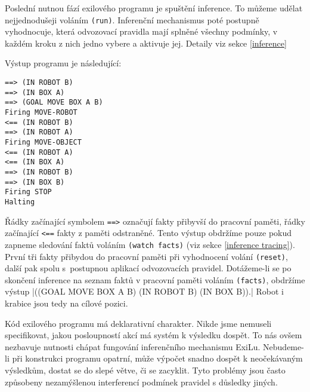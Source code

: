 Poslední nutnou fází exilového programu je spuštění inference. To můžeme udělat
nejjednodušeji voláním \verb|(run)|. Inferenční mechanismus poté postupně
vyhodnocuje, která odvozovací pravidla mají splněné všechny podmínky, v každém
kroku z nich jedno vybere a aktivuje jej. Detaily viz sekce \ref{inference}

Výstup programu je následující:
\begin{verbatim}
==> (IN ROBOT B)
==> (IN BOX A)
==> (GOAL MOVE BOX A B)
Firing MOVE-ROBOT
<== (IN ROBOT B)
==> (IN ROBOT A)
Firing MOVE-OBJECT
<== (IN ROBOT A)
<== (IN BOX A)
==> (IN ROBOT B)
==> (IN BOX B)
Firing STOP
Halting
\end{verbatim}
Řádky začínající symbolem \verb|==>| označují fakty přibyvší do pracovní paměti,
řádky začínající \verb|<==| fakty z paměti odstraněné. Tento výstup obdržíme
pouze pokud zapneme sledování faktů voláním \verb|(watch facts)| (viz sekce
\ref{inference tracing}). První tři fakty přibydou do pracovní paměti při
vyhodnocení volání \verb|(reset)|, další pak spolu s~postupnou aplikací
odvozovacích pravidel. Dotážeme-li se po skončení inference na seznam faktů v
pracovní paměti voláním \verb|(facts)|, obdržíme výstup
\cl|((GOAL MOVE BOX A B) (IN ROBOT B) (IN BOX B)).|
Robot i krabice jsou tedy na cílové pozici.

Kód exilového programu má deklarativní charakter. Nikde jsme nemuseli
specifikovat, jakou posloupností akcí má systém k výsledku dospět. To nás ovšem
nezbavuje nutnosti chápat fungování inferenčního mechanismu ExiLu. Nebudeme-li
při konstrukci programu opatrní, může výpočet snadno dospět k neočekávaným
výsledkům, dostat se do slepé větve, či se zacyklit. Tyto problémy jsou často
způsobeny nezamýšlenou interferencí podmínek pravidel s důsledky jiných.

\FloatBarrier
